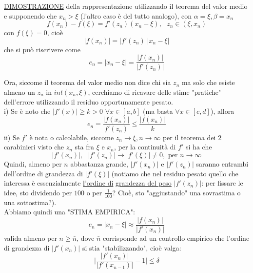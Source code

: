 \documentclass[12pt]{article}
\begin{document}
    \underline{DIMOSTRAZIONE} della rappresentazione utilizzando il teorema del valor medio e supponendo che $x_n>\xi$ (l'altro caso è del tutto analogo), con $\alpha=\xi, \beta=x_n$
\begin{equation*}
	f(x_n)-f(\xi) = f'(z_n)(x_n-\xi), \text{ } z_n \in (\xi,x_n)
\end{equation*}
con $f(\xi)=0$, cioè
\begin{equation*}
	|f(x_n)| = |f'(z_n)||x_n-\xi|
\end{equation*}
che si può riscrivere come
\begin{equation*}
	e_n = |x_n-\xi| = \frac{|f(x_n)|}{|f'(z_n)|}
\end{equation*}

Ora, siccome il teorema del valor medio non dice chi sia $z_n$ ma solo che esiste almeno un $z_n$ in $int(x_n,\xi)$, cerchiamo di ricavare delle stime "pratiche" dell'errore utilizzando il residuo opportunamente pesato.
\\
i) Se è noto che $|f'(x)| \geqslant k >0$ $\forall x \in [a,b]$ (ma basta $\forall x \in [c,d]$), allora
\begin{equation*}
	e_n = \frac{|f(x_n)|}{f'(z_n)} \leqslant \frac{|f(x_n)|}{k}
\end{equation*} 
ii) Se $f'$ è nota o calcolabile, siccome $z_n \to \xi, n \to \infty$ per il teorema dei 2 carabinieri visto che $z_n$ sta fra $\xi$ e $x_n$, per la continuità di $f'$ si ha che
\begin{equation*}
	|f'(x_n)|, \text{ } |f'(z_n)| \to |f'(\xi)| \neq 0, \text{ per } n \to \infty
\end{equation*}
Quindi, almeno per $n$ abbastanza grande, $|f'(x_n)|$ e $|f'(z_n)|$  saranno entrambi dell'ordine di grandezza di $|f'(\xi)|$ (notiamo che nel residuo pesato quello che interessa è essenzialmente \underline{l'ordine di} \underline{grandezza del peso} $|f'(z_n)|$: per fissare le idee, sto dividendo per $100$ o per $\frac{1}{100}$? Cioè, sto "aggiustando" una sovrastima o una sottostima?).\\
Abbiamo quindi una "STIMA EMPIRICA":
\begin{equation*}
	e_n = |x_n-\xi| \approx \frac{|f(x_n)|}{|f'(x_n)|}
\end{equation*} 
valida almeno per $n \geqslant \bar{n}$, dove $\bar{n}$ corrisponde ad un controllo empirico che l'ordine di grandezza di $|f'(x_n)|$ si stia "stabilizzando", cioè valga:
\begin{equation*}
	\lvert\frac{|f'(x_n)|}{|f'(x_{n-1})|}-1\rvert \leqslant \delta
\end{equation*} 
\end{document}
